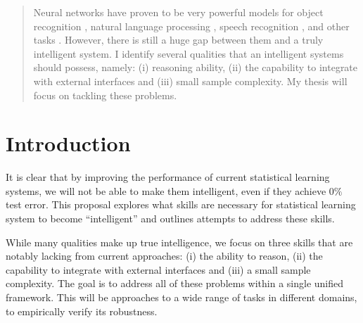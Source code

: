\documentclass{article}
\begin{document}
 


\begin{abstract}

  Neural networks have proven to be very powerful models for object
  recognition \cite{krizhevsky2012imagenet}, natural language
  processing \cite{mikolov2012statistical}, speech recognition
  \cite{graves2013speech}, and other tasks
  \cite{sutskever2014sequence}.  However, there is still a huge gap
  between them and a truly intelligent system.  I identify several
  qualities that an intelligent systems should possess, namely: (i)
  reasoning ability, (ii) the capability to integrate with external
  interfaces and (iii) small sample complexity. My thesis will focus on
  tackling these problems.

\end{abstract} 

\section{Introduction}
It is clear that by improving the performance of current statistical learning systems, 
we will not be able to make them intelligent, even if they achieve
$0\%$ test error. This proposal explores what skills are necessary for statistical
learning system to become ``intelligent'' and outlines attempts to
address these skills. 

While many qualities make up true intelligence, we focus on three
skills that are notably lacking from current approaches: (i) the
ability to reason, (ii) the capability to integrate with external
interfaces and (iii) a small sample complexity. The goal is to address
all of these problems within a single unified framework. This will be
approaches to a wide range of tasks in different domains, to empirically
verify its robustness. 
\end{document}
